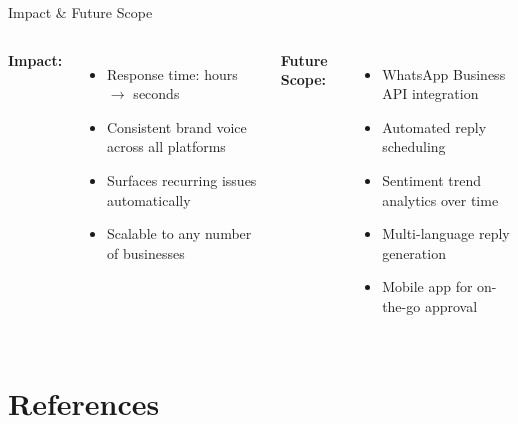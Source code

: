 \documentclass[aspectratio=169]{beamer}
\begin{document}
\begin{frame}{Impact \& Future Scope}
  \begin{columns}
    \textbf{Impact:}
    \begin{itemize}
      \item Response time: hours $\rightarrow$ seconds
      \item Consistent brand voice across all platforms
      \item Surfaces recurring issues automatically
      \item Scalable to any number of businesses
    \end{itemize}

    \textbf{Future Scope:}
    \begin{itemize}
      \item WhatsApp Business API integration
      \item Automated reply scheduling
      \item Sentiment trend analytics over time
      \item Multi-language reply generation
      \item Mobile app for on-the-go approval
    \end{itemize}
  \end{columns}
\end{frame}

\section{References}
\end{document}

